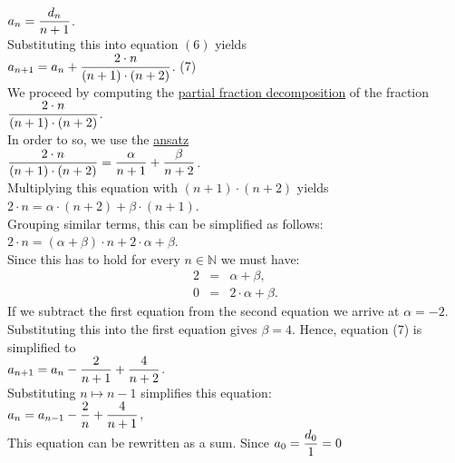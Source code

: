\hspace*{1.3cm}
$\displaystyle a_n = \frac{d_n}{n+1}$. 
\\[0.2cm] 
Substituting this into equation $(6)$ yields
\\[0.2cm]
\hspace*{1.3cm}
$\displaystyle a_{n+1} = a_{n} + \frac{2\cdot n}{(n+1)\cdot(n+2)}$.  \hspace*{\fill} (7)
\\[0.2cm]
We proceed by computing the 
\href{http://en.wikipedia.org/wiki/Partial_fraction}{partial fraction decomposition}
of the fraction
\\[0.2cm]
\hspace*{1.3cm}
$\displaystyle\frac{2\cdot n}{(n+1)\cdot(n+2)}$.
\\[0.2cm] 
In order to so, we use the \href{http://en.wikipedia.org/wiki/Ansatz}{ansatz}
\\[0.2cm]
\hspace*{1.3cm}
$\displaystyle\frac{2\cdot n}{(n+1)\cdot(n+2)} = \frac{\alpha}{n+1} + \frac{\beta}{n+2}$.
\\[0.2cm] 
Multiplying this equation with $(n+1) \cdot (n+2)$ yields
\\[0.2cm]
\hspace*{1.3cm}
$ 2\cdot n = \alpha \cdot (n+2) + \beta \cdot (n+1)$.
\\[0.2cm]
Grouping similar terms, this can be simplified as follows:
\\[0.2cm]
\hspace*{1.3cm}
$2\cdot n = (\alpha + \beta) \cdot n + 2 \cdot \alpha  + \beta$.
\\[0.2cm]
Since this has to hold for every $n \in \mathbb{N}$ we must have:
\begin{eqnarray*}
  2 & = & \alpha + \beta, \\
  0 & = & 2 \cdot \alpha + \beta.
\end{eqnarray*}
If we subtract the first equation from the second equation we arrive at
 $\alpha = -2$.  Substituting this into the first equation gives $\beta = 4$.
Hence,  equation (7) is simplified to
\\[0.2cm]
\hspace*{1.3cm}
$\displaystyle a_{n+1} = a_{n} - \frac{2}{n+1} + \frac{4}{n+2}$.
\\[0.2cm] 
Substituting $n \mapsto n-1$ simplifies this equation: 
\\[0.2cm]
\hspace*{1.3cm}
$\displaystyle a_{n} = a_{n-1} - \frac{2}{n} + \frac{4}{n+1}$,
\\[0.2cm] 
This equation can be rewritten as a sum.  Since $a_0 = \displaystyle\frac{d_0}{1} = 0$
